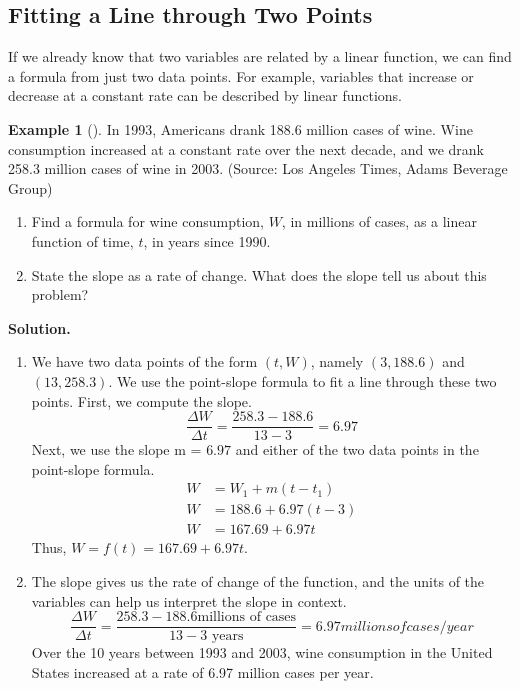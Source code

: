 \documentclass[10pt,]{book}
\theoremstyle{plain}
\theoremstyle{definition}
\theoremstyle{definition}
\newtheorem{example}[theorem]{Example}
\theoremstyle{definition}
\theoremstyle{definition}
\numberwithin{equation}{part}
\newcommand{\amp}{&}
\begin{document}
\subsection[{Fitting a Line through Two Points}]{Fitting a Line through Two Points}\label{subsection-33}
If we already know that two variables are related by a linear function, we can find a formula from just two data points. For example, variables that increase or decrease at a constant rate can be described by linear functions.%
\begin{example}[]\label{example-wine}
In 1993, Americans drank 188.6 million cases of wine. Wine consumption increased at a constant rate over the next decade, and we drank 258.3 million cases of wine in 2003. (Source: Los Angeles Times, Adams Beverage Group)%
\leavevmode%
\begin{enumerate}[label=*\alph**]
\item\hypertarget{li-1283}{}Find a formula for wine consumption, \(W\), in millions of cases, as a linear function of time, \(t\), in years since 1990.%
\item\hypertarget{li-1284}{}State the slope as a rate of change. What does the slope tell us about this problem?%
\end{enumerate}
\par\medskip\noindent%
\textbf{Solution.}\quad \leavevmode%
\begin{enumerate}[label=*\alph**]
\item\hypertarget{li-1285}{}We have two data points of the form \((t, W)\), namely \((3, 188.6)\) and \((13, 258.3)\). We use the point-slope formula to fit a line through these two points. First, we compute the slope.%
\begin{equation*}
\frac{\Delta W}{\Delta t}=\frac {258.3 - 188.6}{13 - 3}= 6.97
\end{equation*}
Next, we use the slope m = \(6.97\) and either of the two data points in the point-slope formula. \begin{align*} W \amp =W_1 + m(t - t_1) \\ W \amp = 188.6 + 6.97(t - 3) \\ W \amp = 167.69 + 6.97t \end{align*} Thus, \(W = f (t) = 167.69 + 6.97t\).%
\item\hypertarget{li-1286}{}The slope gives us the rate of change of the function, and the units of the variables can help us interpret the slope in context.%
\begin{equation*}
\frac{\Delta W}{\Delta t}= 
\frac{258.3 - 188.6 \text{millions of cases}}{13 - 3\text{ years}}
= 6.97 millions of cases /year
\end{equation*}
Over the 10 years between 1993 and 2003, wine consumption in the United States increased at a rate of 6.97 million cases per year.%
\end{enumerate}
%
\end{example}
\end{document}

